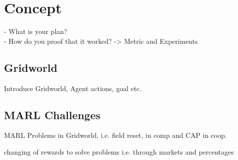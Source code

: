 %
%
\chapter{Concept}\label{sec:Concept}
- What is your plan? \\
- How do you proof that it worked? -> Metric and Experiments


\section{Gridworld}
Introduce Gridworld, Agent actions, goal etc.

\section{MARL Challenges}
MARL Problems in Gridworld, i.e. field reset, in comp and CAP in coop.

changing of rewards to solve problems i.e. through markets and percentages